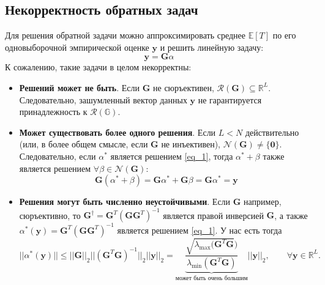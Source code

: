 \documentclass[a4paper,12pt]{article}
\theoremstyle{plain}
\theoremstyle{definition}
\theoremstyle{remark}
\begin{document}
\subsection{Некорректность обратных задач}
Для решения обратной задачи можно аппроксимировать 
среднее $\mathbb{E}[T]$ по его одновыборочной эмпирической 
оценке $\textbf{y}$ и решить линейную задачу:
\begin{equation}
\label{eq_1}
\textbf{y} = \textbf{G} \alpha
\end{equation}
К сожалению, такие задачи в целом некорректны:
\begin{itemize}
\item \textbf{Решений может не быть}. 
Если $\textbf{G}$ не сюръективен,
$\mathcal{R}(\textbf{G}) \subseteq \mathbb{R}^L$. 
Следовательно, зашумленный вектор данных $\textbf{y}$ 
не гарантируется принадлежность к $\mathcal{R}(\mathbb{G})$.
\item \textbf{Может существовать более одного решения}. 
Если $L < N$ действительно (или, в более общем смысле, если 
$\textbf{G}$ не инъективен), 
$\mathcal{N}(\textbf{G}) \neq \{ \textbf{0} \}$. 
Следовательно, если $\alpha^{*}$ является решением 
\eqref{eq_1}, тогда $\alpha^{*} + \beta$ также является решением
$\forall \beta \in \mathcal{N}(\textbf{G})$:
\[
\textbf{G}(\alpha^{*} + \beta) =
\textbf{G} \alpha^{*} + \textbf{G} \beta =
\textbf{G} \alpha^{*} = \textbf{y}
\]
\item \textbf{Решения могут быть численно неустойчивыми}.
Если $\textbf{G}$ например, сюръективно, то
$\textbf{G}^{\dagger} = 
\textbf{G}^{T}(\textbf{G} \textbf{G}^{T})^{-1}$
является правой инверсией $\textbf{G}$,
а также 
$\alpha^{*}(\textbf{y}) =
\textbf{G}^{T}(\textbf{G} \textbf{G}^{T})^{-1}$
является решением \eqref{eq_1}. 
У нас есть тогда
\[
||\alpha^{*}(\textbf{y})|| \leq
||\textbf{G}||_{2}
||(\textbf{G}^{T} \textbf{G})^{-1}||_2
||\textbf{y}||_2 =
\underbrace{
\dfrac{
\sqrt{\lambda_{\text{max}}(\textbf{G}^{T}\textbf{G}})
}{
\lambda_{\text{min}}(\textbf{G}^{T}\textbf{G})
}}_{\text{может быть очень большим}} 
||\textbf{y}||_2, \qquad 
\forall \textbf{y} \in \mathbb{R}^L.
\]
\end{itemize}
\end{document}
